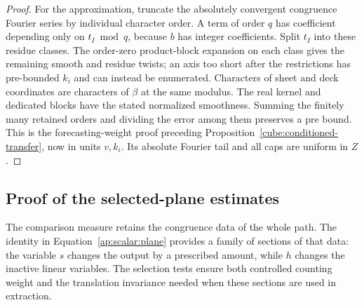 \begin{proof}
For the approximation, truncate the absolutely convergent congruence
Fourier series by individual character order. A term of order $q$
has coefficient depending only on $t_I\bmod q$, because $b$ has
integer coefficients. Split $t_I$ into these residue classes. The
order-zero product-block expansion on each class gives the remaining
smooth and residue twists; an axis too short after the restrictions
has pre-bounded $k_i$ and can instead be enumerated. Characters of
sheet and deck coordinates are characters of $\beta$ at the same
modulus. The real kernel and dedicated blocks have the stated
normalized smoothness. Summing the finitely many retained orders and
dividing the error among them preserves a pre bound. This is the
forecasting-weight proof preceding
Proposition~\ref{cube:conditioned-transfer}, now in units $v,k_i$.
Its absolute Fourier tail and all caps are uniform in $Z$.
\end{proof}

\subsection{Proof of the selected-plane estimates}

The comparison measure retains the congruence data of the whole path.
The identity in Equation~\eqref{ap:scalar:plane} provides a family of
sections of that data: the variable $s$ changes the output by a
prescribed amount, while $h$ changes the inactive linear variables.
The selection tests ensure both controlled counting weight and the
translation invariance needed when these sections are used in extraction.

